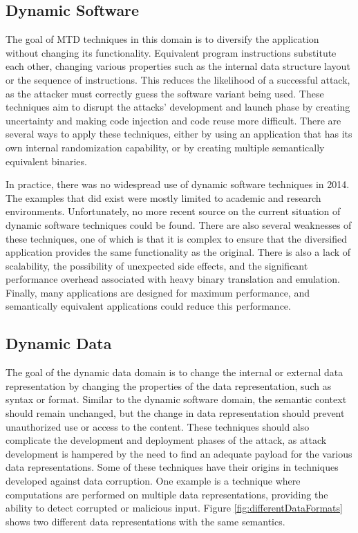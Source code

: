 \subsection{Dynamic Software}
The goal of MTD techniques in this domain is to diversify the application without changing its functionality. Equivalent program instructions substitute each other, changing various properties such as the internal data structure layout or the sequence of instructions. This reduces the likelihood of a successful attack, as the attacker must correctly guess the software variant being used. These techniques aim to disrupt the attacks' development and launch phase by creating uncertainty and making code injection and code reuse more difficult. There are several ways to apply these techniques, either by using an application that has its own internal randomization capability, or by creating multiple semantically equivalent binaries.

In practice, there was no widespread use of dynamic software techniques in 2014. The examples that did exist were mostly limited to academic and research environments. Unfortunately, no more recent source on the current situation of dynamic software techniques could be found. There are also several weaknesses of these techniques, one of which is that it is complex to ensure that the diversified application provides the same functionality as the original. There is also a lack of scalability, the possibility of unexpected side effects, and the significant performance overhead associated with heavy binary translation and emulation. Finally, many applications are designed for maximum performance, and semantically equivalent applications could reduce this performance.  


\subsection{Dynamic Data}
The goal of the dynamic data domain is to change the internal or external data representation by changing the properties of the data representation, such as syntax or format. Similar to the dynamic software domain, the semantic context should remain unchanged, but the change in data representation should prevent unauthorized use or access to the content. These techniques should also complicate the development and deployment phases of the attack, as attack development is hampered by the need to find an adequate payload for the various data representations. Some of these techniques have their origins in techniques developed against data corruption. One example is a technique where computations are performed on multiple data representations, providing the ability to detect corrupted or malicious input. Figure \ref{fig:differentDataFormats} shows two different data representations with the same semantics. 

